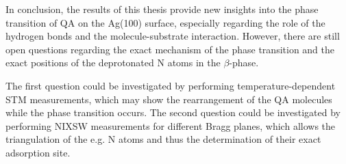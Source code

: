 In conclusion, the results of this thesis provide new insights into the phase transition of \ac{QA} on the Ag(100) surface, especially regarding the role of the hydrogen bonds and the molecule-substrate interaction. However, there are still open questions regarding the exact mechanism of the phase transition and the exact positions of the deprotonated N atoms in the $\beta$-phase.

The first question could be investigated by performing temperature-dependent \ac{STM} measurements, which may show the rearrangement of the \ac{QA} molecules while the phase transition occurs. The second question could be investigated by performing \ac{NIXSW} measurements for different Bragg planes, which allows the triangulation of the e.g. N atoms and thus the determination of their exact adsorption site.


\cleardoublepage